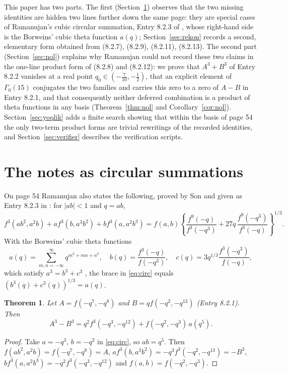 \documentclass[pdflatex,sn-mathphys-num]{sn-jnl}
\theoremstyle{thmstyleone}%
\newtheorem{theorem}{Theorem}%
\theoremstyle{thmstyletwo}%
\newcommand{\f}{f}
\begin{document}
This paper has two parts. The first (Section~\ref{sec:circ}) observes that the two
missing identities are hidden two lines further down the same page: they are
special cases of Ramanujan's cubic circular summation, Entry 8.2.3 of
\cite{AB2}, whose right-hand side is the Borweins' cubic theta function
$a(q)$; Section~\ref{sec:rekon} records a second, elementary form obtained from
(8.2.7), (8.2.9), (8.2.11), (8.2.13). The second part (Section~\ref{sec:nol})
explains why Ramanujan could not record these two claims in the one-line product
form of (8.2.8) and (8.2.12): we prove that $A^3+B^3$ of Entry 8.2.2 vanishes at a
real point $q_0\in(-\frac{7}{10},-\frac12)$, that an explicit element of
$\Gamma_0(15)$ conjugates the two families and carries this zero to a zero of
$A-B$ in Entry 8.2.1, and that consequently neither deferred combination is a
product of theta functions in any basis (Theorem~\ref{thm:nol} and
Corollary~\ref{cor:nol}). Section~\ref{sec:yoqlik} adds a finite search showing
that within the basis of page 54 the only two-term product forms are trivial rewritings of the recorded identities, and
Section~\ref{sec:verifier} describes the verification scripts.

\section{The notes as circular summations}\label{sec:circ}
On page 54 Ramanujan also states the following, proved by Son \cite{Son04} and
given as Entry 8.2.3 in \cite[p.~178]{AB2}: for $|ab|<1$ and $q=ab$,
\begin{equation}\label{eq:circ}
\f^3(ab^2,a^2b)+a\f^3(b,a^3b^2)+b\f^3(a,a^2b^3)
=\f(a,b)\left\{\frac{\f^9(-q)}{\f^3(-q^3)}+27q\,\frac{\f^9(-q^3)}{\f^3(-q)}\right\}^{1/3}.
\end{equation}
With the Borweins' cubic theta functions \cite{BB91,BBG94}
\[
a(q)=\sum_{m,n=-\infty}^{\infty}q^{m^2+mn+n^2},\quad
b(q)=\frac{\f^3(-q)}{\f(-q^3)},\quad
c(q)=3q^{1/3}\frac{\f^3(-q^3)}{\f(-q)},
\]
which satisfy $a^3=b^3+c^3$ \cite{BB91}, the brace in \eqref{eq:circ} equals $(b^3(q)+c^3(q))^{1/3}=a(q)$.

\begin{theorem}\label{thm:3}
Let $A=\f(-q^7,-q^8)$ and $B=q\f(-q^2,-q^{13})$ (Entry 8.2.1). Then
\begin{equation}\label{eq:T3}
A^3-B^3=q^2\f^3(-q^3,-q^{12})+\f(-q^2,-q^3)\,a(q^5).
\end{equation}
\end{theorem}
\begin{proof}
Take $a=-q^3$, $b=-q^2$ in \eqref{eq:circ}, so $ab=q^5$. Then
$\f(ab^2,a^2b)=\f(-q^7,-q^8)=A$,
$a\f^3(b,a^3b^2)=-q^3\f^3(-q^2,-q^{13})=-B^3$,
$b\f^3(a,a^2b^3)=-q^2\f^3(-q^3,-q^{12})$ and $\f(a,b)=\f(-q^2,-q^3)$.
\end{proof}
\end{document}
